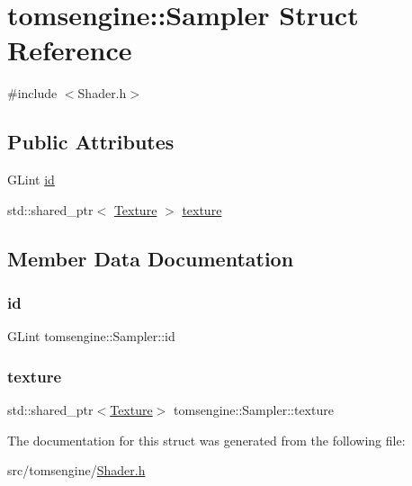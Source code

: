 \hypertarget{structtomsengine_1_1_sampler}{}\section{tomsengine\+:\+:Sampler Struct Reference}
\label{structtomsengine_1_1_sampler}


{\ttfamily \#include $<$Shader.\+h$>$}

\subsection*{Public Attributes}
\begin{DoxyCompactItemize}
\item 
G\+Lint \mbox{\hyperlink{structtomsengine_1_1_sampler_a83b57ed27e47aa70ad7cf3f916e2dd49}{id}}
\item 
std\+::shared\+\_\+ptr$<$ \mbox{\hyperlink{classtomsengine_1_1_texture}{Texture}} $>$ \mbox{\hyperlink{structtomsengine_1_1_sampler_a30ac7eac57cbd1cbd791ca304fe3f9d5}{texture}}
\end{DoxyCompactItemize}


\subsection{Member Data Documentation}
\mbox{\label{structtomsengine_1_1_sampler_a83b57ed27e47aa70ad7cf3f916e2dd49}} 
\subsubsection{\texorpdfstring{id}{id}}
{\footnotesize\ttfamily G\+Lint tomsengine\+::\+Sampler\+::id}

\mbox{\label{structtomsengine_1_1_sampler_a30ac7eac57cbd1cbd791ca304fe3f9d5}} 
\subsubsection{\texorpdfstring{texture}{texture}}
{\footnotesize\ttfamily std\+::shared\+\_\+ptr$<$\mbox{\hyperlink{classtomsengine_1_1_texture}{Texture}}$>$ tomsengine\+::\+Sampler\+::texture}



The documentation for this struct was generated from the following file\+:\begin{DoxyCompactItemize}
\item 
src/tomsengine/\mbox{\hyperlink{_shader_8h}{Shader.\+h}}\end{DoxyCompactItemize}
